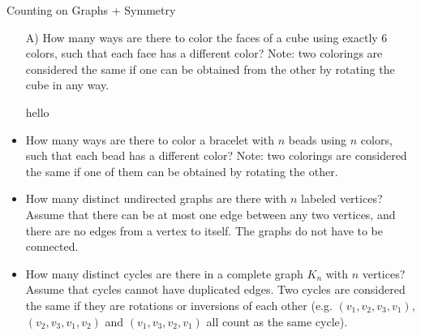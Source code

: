 \begin{homeworkProblem}{Counting on Graphs + Symmetry}
\begin{itemize}

    \item[A)] How many ways are there to color the faces of a cube using exactly 
    $6$ colors, such that each face has a different color? Note: two colorings 
    are considered the same if one can be obtained from the other by rotating 
    the cube in any way.
    
    \solution
    hello

    \item How many ways are there to color a bracelet with $n$ beads using 
    $n$ colors, such that each bead has a different color? Note: two colorings 
    are considered the same if one of them can be obtained by rotating the 
    other.
    
    \solution

    \item How many distinct undirected graphs are there with $n$ labeled 
    vertices? Assume that there can be at most one edge between any two 
    vertices, and there are no edges from a vertex to itself. The graphs do 
    not have to be connected.
    
    \solution

    \item How many distinct cycles are there in a complete graph $K_n$ with 
    $n$ vertices? Assume that cycles cannot have duplicated edges. Two cycles 
    are considered the same if they are rotations or inversions of each other 
    (e.g. $(v_1,v_2,v_3,v_1)$, $(v_2,v_3,v_1,v_2)$ and $(v_1,v_3,v_2,v_1)$ 
    all count as the same cycle).
    
    \solution

\end{itemize}
\end{homeworkProblem}
